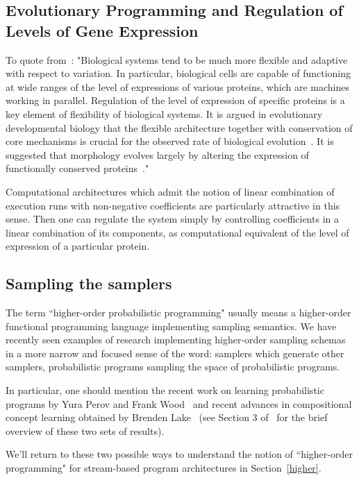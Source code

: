 \documentclass{llncs}
\begin{document}
\subsection{Evolutionary Programming and Regulation of Levels of Gene Expression}

To quote from~\cite{MBukatinMatthews}: "Biological systems tend to be much more flexible and adaptive with respect to variation. In particular, biological cells are capable of functioning
at wide ranges of the level of expressions of various proteins, which are machines working in parallel. Regulation of the level of expression
of specific proteins is a key element of flexibility of biological systems. It is argued in evolutionary developmental biology
that the flexible architecture together with conservation of core mechanisms is crucial for the observed rate of 
biological evolution~\cite{JGerhartKirschner,MKirschnerGerhart}.
It is suggested that morphology evolves largely by altering the expression of functionally conserved proteins~\cite{SCarrol}."

Computational architectures which admit the notion of linear combination of execution runs with non-negative coefficients are particularly attractive in this sense. 
Then one can regulate the system simply by controlling coefficients in a linear combination of its components,  as
computational equivalent of the level of expression of a particular protein. 

\subsection{Sampling the samplers}\label{sampling_the_samplers}

The term ``higher-order probabilistic programming" usually means a higher-order functional
programming language implementing sampling semantics. We have recently seen examples of research
implementing higher-order sampling schemas in a more narrow and focused sense of the word:
samplers which generate other samplers, probabilistic programs sampling the space of
probabilistic programs. 

In particular, one should mention 
the recent work on learning probabilistic programs by Yura Perov and Frank Wood~\cite{YPerovWood}
and recent advances in compositional concept learning obtained by Brenden Lake~\cite{BLake} (see Section 3 of~\cite{MBukatinMatthews}  for the brief
overview of these two sets of results).

We'll return to these two possible ways to understand the notion of ``higher-order programming"
for stream-based program architectures in Section~\ref{higher}.
\end{document}
